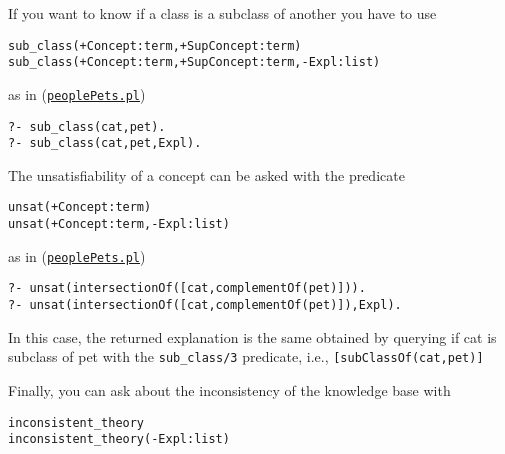 If you want to know if a class is a subclass of another you have to use
\begin{verbatim}
sub_class(+Concept:term,+SupConcept:term)
sub_class(+Concept:term,+SupConcept:term,-Expl:list)
\end{verbatim}
as in (\href{http://trill.lamping.unife.it/example/trill/peoplePets.pl}{\texttt{peoplePets.pl}})
\begin{verbatim}
?- sub_class(cat,pet).
?- sub_class(cat,pet,Expl).
\end{verbatim}

The unsatisfiability of a concept can be asked with the predicate
\begin{verbatim}
unsat(+Concept:term)
unsat(+Concept:term,-Expl:list)
\end{verbatim}
as in (\href{http://trill.lamping.unife.it/example/trill/peoplePets.pl}{\texttt{peoplePets.pl}})
\begin{verbatim}
?- unsat(intersectionOf([cat,complementOf(pet)])).
?- unsat(intersectionOf([cat,complementOf(pet)]),Expl).
\end{verbatim}
In this case, the returned explanation is the same obtained by querying if cat is subclass of pet with the \verb|sub_class/3| predicate, i.e., \verb|[subClassOf(cat,pet)]|

Finally, you can ask about the inconsistency of the knowledge base with
\begin{verbatim}
inconsistent_theory
inconsistent_theory(-Expl:list)
\end{verbatim}